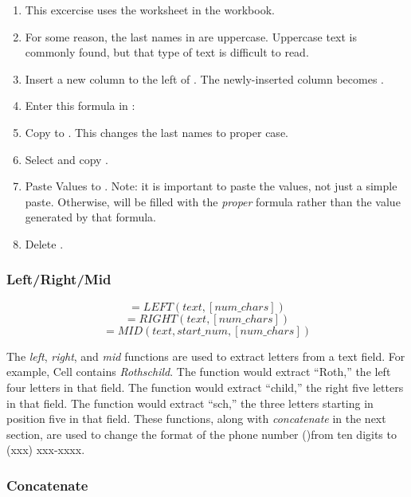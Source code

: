 \begin{enumerate}
	\item This excercise uses the  worksheet in the  workbook.
	\item For some reason, the last names in  are uppercase. Uppercase text is commonly found, but that type of text is difficult to read.
	\item Insert a new column to the left of . The newly-inserted column becomes .
	\item Enter this formula in : 
	\item Copy  to . This changes the last names to proper case.
	\item Select and copy .
	\item Paste Values to . Note: it is important to paste the values, not just a simple paste. Otherwise,  will be filled with the \textit{proper} formula rather than the value generated by that formula.
	\item Delete .
\end{enumerate}

\subsubsection{Left/Right/Mid}

\[ =LEFT(text, [num\_chars]) \]
\[ =RIGHT(text, [num\_chars]) \]
\[ =MID(text, start\_num, [num\_chars]) \]

The \textit{left}, \textit{right}, and \textit{mid} functions are used to extract letters from a text field. For example, Cell  contains \textit{Rothschild}. The function  would extract ``Roth,'' the left four letters in that field. The function  would extract ``child,'' the right five letters in that field. The function  would extract ``sch,'' the three letters starting in position five in that field. These functions, along with \textit{concatenate} in the next section, are used to change the format of the phone number ()from ten digits to (xxx) xxx-xxxx.

\subsubsection{Concatenate}

